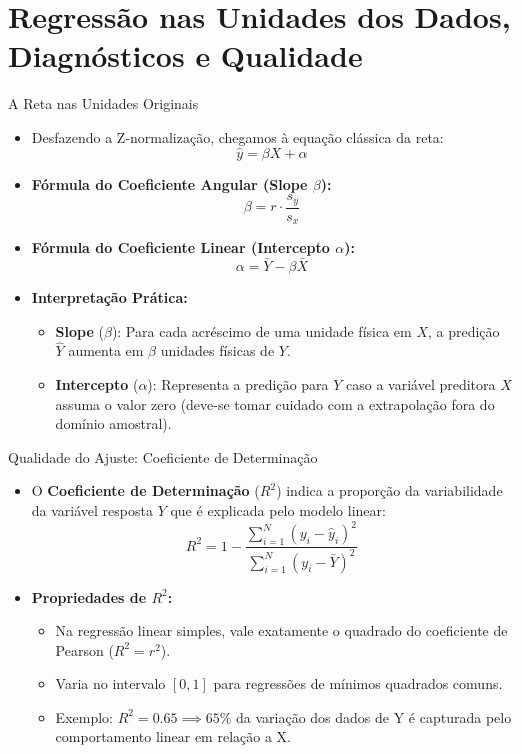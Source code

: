\section{Regressão nas Unidades dos Dados, Diagnósticos e Qualidade}

\begin{frame}{A Reta nas Unidades Originais}
    \begin{itemize}
        \item Desfazendo a Z-normalização, chegamos à equação clássica da reta:
        $$\hat{y} = \beta X + \alpha$$
        \item \textbf{Fórmula do Coeficiente Angular (Slope $\beta$):}
        $$\beta = r \cdot \frac{s_y}{s_x}$$
        \item \textbf{Fórmula do Coeficiente Linear (Intercepto $\alpha$):}
        $$\alpha = \bar{Y} - \beta \bar{X}$$
        \item \textbf{Interpretação Prática:}
        \begin{itemize}
            \item \textbf{Slope} ($\beta$): Para cada acréscimo de uma unidade física em $X$, a predição $\hat{Y}$ aumenta em $\beta$ unidades físicas de $Y$.
            \item \textbf{Intercepto} ($\alpha$): Representa a predição para $Y$ caso a variável preditora $X$ assuma o valor zero (deve-se tomar cuidado com a extrapolação fora do domínio amostral).
        \end{itemize}
    \end{itemize}
\end{frame}

\begin{frame}{Qualidade do Ajuste: Coeficiente de Determinação}
    \begin{itemize}
        \item O \textbf{Coeficiente de Determinação} ($R^2$) indica a proporção da variabilidade da variável resposta $Y$ que é explicada pelo modelo linear:
        $$R^2 = 1 - \frac{\sum_{i=1}^N (y_i - \hat{y}_i)^2}{\sum_{i=1}^N (y_i - \bar{Y})^2}$$
        \item \textbf{Propriedades de $R^2$:}
        \begin{itemize}
            \item Na regressão linear simples, vale exatamente o quadrado do coeficiente de Pearson ($R^2 = r^2$).
            \item Varia no intervalo $[0, 1]$ para regressões de mínimos quadrados comuns.
            \item Exemplo: $R^2 = 0.65 \implies 65\%$ da variação dos dados de Y é capturada pelo comportamento linear em relação a X.
        \end{itemize}
    \end{itemize}
\end{frame}

